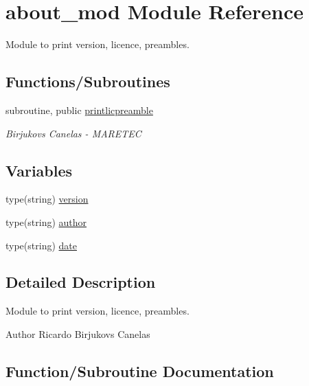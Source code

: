 \hypertarget{namespaceabout__mod}{}\section{about\+\_\+mod Module Reference}
\label{namespaceabout__mod}


Module to print version, licence, preambles.  


\subsection*{Functions/\+Subroutines}
\begin{DoxyCompactItemize}
\item 
subroutine, public \hyperlink{namespaceabout__mod_a9fb866e1576b843b42649d84b80f4b52}{printlicpreamble}
\begin{DoxyCompactList}\small\item\em Birjukovs Canelas -\/ M\+A\+R\+E\+T\+EC \end{DoxyCompactList}\end{DoxyCompactItemize}
\subsection*{Variables}
\begin{DoxyCompactItemize}
\item 
type(string) \hyperlink{namespaceabout__mod_af0051041c5a98e3eb7284580236db3a0}{version}
\item 
type(string) \hyperlink{namespaceabout__mod_a7c3a72ae7ba5fc7d8a4bf133605f58c3}{author}
\item 
type(string) \hyperlink{namespaceabout__mod_aaac12f65380fb0f10916b3744d9e5a0b}{date}
\end{DoxyCompactItemize}


\subsection{Detailed Description}
Module to print version, licence, preambles. 

\begin{DoxyAuthor}{Author}
Ricardo Birjukovs Canelas 
\end{DoxyAuthor}


\subsection{Function/\+Subroutine Documentation}
\mbox{\label{namespaceabout__mod_a9fb866e1576b843b42649d84b80f4b52}} 
